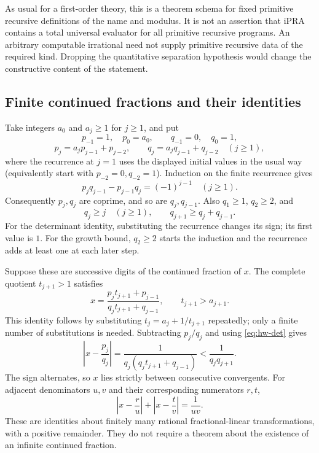 As usual for a first-order theory, this is a theorem schema for fixed primitive
recursive definitions of the name and modulus.  It is not an assertion that
iPRA contains a total universal evaluator for all primitive recursive programs.
An arbitrary computable irrational need not supply primitive recursive data
of the required kind.  Dropping the quantitative separation hypothesis would
change the constructive content of the statement.

\subsection{Finite continued fractions and their identities}

Take integers \(a_0\) and \(a_j\ge1\) for \(j\ge1\), and put
\[
 p_{-1}=1,\quad p_0=a_0,\qquad q_{-1}=0,\quad q_0=1,
\]
\[
 p_j=a_jp_{j-1}+p_{j-2},\qquad
 q_j=a_jq_{j-1}+q_{j-2}\quad(j\ge1),
\]
where the recurrence at \(j=1\) uses the displayed initial values in the
usual way (equivalently start with \(p_{-2}=0,q_{-2}=1\)).
Induction on the finite recurrence gives
\begin{equation}\label{eq:hw-det}
 p_jq_{j-1}-p_{j-1}q_j=(-1)^{j-1}\quad(j\ge1).
\end{equation}
Consequently \(p_j,q_j\) are coprime, and so are \(q_j,q_{j-1}\).
Also \(q_1\ge1\), \(q_2\ge2\), and
\begin{equation}\label{eq:hw-growth}
 q_j\ge j\quad(j\ge1),\qquad q_{j+1}\ge q_j+q_{j-1}.
\end{equation}
For the determinant identity, substituting the recurrence changes its sign;
its first value is \(1\).  For the growth bound, \(q_2\ge2\) starts the
induction and the recurrence adds at least one at each later step.

Suppose these are successive digits of the continued fraction of \(x\).
The complete quotient \(t_{j+1}>1\) satisfies
\[
 x=\frac{p_jt_{j+1}+p_{j-1}}{q_jt_{j+1}+q_{j-1}},\qquad
 t_{j+1}>a_{j+1}.
\]
This identity follows by substituting \(t_j=a_j+1/t_{j+1}\) repeatedly;
only a finite number of substitutions is needed.  Subtracting \(p_j/q_j\)
and using \eqref{eq:hw-det} gives
\begin{equation}\label{eq:hw-error}
 \left|x-\frac{p_j}{q_j}\right|
 =\frac1{q_j(q_jt_{j+1}+q_{j-1})}
 <\frac1{q_jq_{j+1}}.
\end{equation}
The sign alternates, so \(x\) lies strictly between consecutive convergents.
For adjacent denominators \(u,v\) and their corresponding numerators \(r,t\),
\begin{equation}\label{eq:hw-bracket}
 \left|x-\frac r u\right|+
 \left|x-\frac t v\right|=\frac1{uv}.
\end{equation}
These are identities about finitely many rational fractional-linear
transformations, with a positive remainder.  They do not require a theorem
about the existence of an infinite continued fraction.

